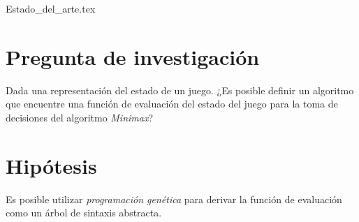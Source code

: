 \documentclass[submission]{eptcs}
\begin{document}
  \begin{titlepage}
    \centering
    \titleblock [2cm]
    \vspace{1cm}
    {\Large \authorblock}
  \end{titlepage}
  



  {Estado_del_arte.tex}










  \section{Pregunta de investigación}
    Dada una representación del estado de un juego. 
    ¿Es posible definir un algoritmo que encuentre una función de evaluación del estado del juego 
    para la toma de decisiones del algoritmo \textit{Minimax}?

  \section{Hipótesis}
    Es posible utilizar \textit{programación genética} para derivar la función de evaluación como
    un árbol de sintaxis abstracta.
\end{document}
